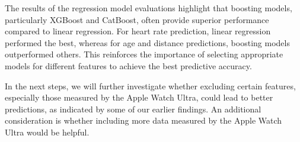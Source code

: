The results of the regression model evaluations highlight that boosting models, particularly XGBoost and CatBoost, often provide superior performance compared to linear regression. For heart rate prediction, linear regression performed the best, whereas for age and distance predictions, boosting models outperformed others. This reinforces the importance of selecting appropriate models for different features to achieve the best predictive accuracy.

In the next steps, we will further investigate whether excluding certain features, especially those measured by the Apple Watch Ultra, could lead to better predictions, as indicated by some of our earlier findings. An additional consideration is whether including more data measured by the Apple Watch Ultra would be helpful.

\newpage

